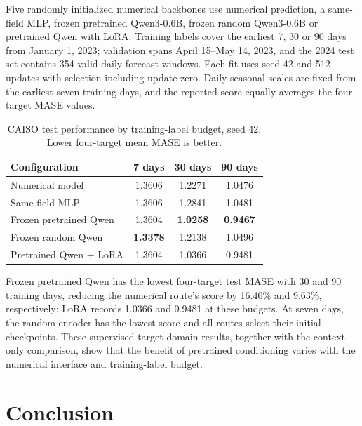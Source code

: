 \documentclass[journal]{IEEEtran}
\begin{document}
Five randomly initialized numerical backbones use numerical prediction, a same-field MLP, frozen pretrained Qwen3-0.6B, frozen random Qwen3-0.6B or pretrained Qwen with LoRA. Training labels cover the earliest 7, 30 or 90 days from January 1, 2023; validation spans April 15--May 14, 2023, and the 2024 test set contains 354 valid daily forecast windows. Each fit uses seed 42 and 512 updates with selection including update zero. Daily seasonal scales are fixed from the earliest seven training days, and the reported score equally averages the four target MASE values.

\begin{table}[!t]
\caption{CAISO test performance by training-label budget, seed 42. Lower four-target mean MASE is better.}
\label{tab:caiso_target_only}
\centering\footnotesize
\setlength{\tabcolsep}{4pt}
\renewcommand{\arraystretch}{1.10}
\begin{tabular*}{\columnwidth}{@{\extracolsep{\fill}}lccc@{}}
\toprule
Configuration & 7 days & 30 days & 90 days \\
\midrule
Numerical model & 1.3606 & 1.2271 & 1.0476 \\
Same-field MLP & 1.3606 & 1.2841 & 1.0481 \\
Frozen pretrained Qwen & 1.3604 & \textbf{1.0258} & \textbf{0.9467} \\
Frozen random Qwen & \textbf{1.3378} & 1.2138 & 1.0496 \\
Pretrained Qwen + LoRA & 1.3604 & 1.0366 & 0.9481 \\
\bottomrule
\end{tabular*}
\end{table}

Frozen pretrained Qwen has the lowest four-target test MASE with 30 and 90 training days, reducing the numerical route's score by 16.40\% and 9.63\%, respectively; LoRA records 1.0366 and 0.9481 at these budgets. At seven days, the random encoder has the lowest score and all routes select their initial checkpoints. These supervised target-domain results, together with the context-only comparison, show that the benefit of pretrained conditioning varies with the numerical interface and training-label budget.



\section{Conclusion}
\label{sec:conclusion}
\end{document}
